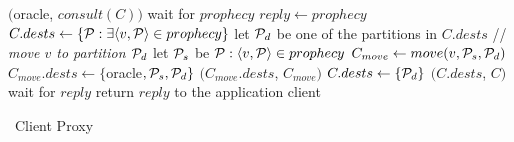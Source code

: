 \begin{algorithm}[h!]
\small

\begin{distribalgo}[1]

\vspace{1.0mm}

\vspace{1.0mm}

        \STATE \amcast$($oracle, $consult(C))$
        \STATE wait for $prophecy$
            \STATE $reply \leftarrow prophecy$
        \ELSE
            \STATE $C.dests \leftarrow \{\mathcal{P} : \exists \langle v, \mathcal{P} \rangle \in prophecy \}$
                \STATE let $\mathcal{P}_d$ be one of the partitions in $C.dests$
                \label{algline:client:partition}
                    \STATE // \textit{move $v$ to partition $\mathcal{P}_d$}
                    \STATE let $\mathcal{P}_s$ be $\mathcal{P} : \langle v, \mathcal{P} \rangle \in prophecy$
                        \STATE $C_{move} \leftarrow move(v,\mathcal{P}_s,\mathcal{P}_d)$
                        \STATE $C_{move}.dests \leftarrow \{$oracle$,\mathcal{P}_s,\mathcal{P}_d\}$
                        \STATE \amcast$(C_{move}.dests$, $C_{move})$
                    \ENDIF
                \ENDFOR
                \STATE $C.dests \leftarrow \{ \mathcal{P}_d \}$
            \ENDIF
                \STATE {}
            \ENDIF
            \STATE \amcast$(C.dests$, $C)$
            \STATE wait for $reply$
        \ENDIF
    \ENDINDENT
    \STATE return $reply$ to the application client
\ENDINDENT

\caption{\dssmr\ Client Proxy}
\label{alg:client_proxy}
\end{distribalgo}
\end{algorithm}
